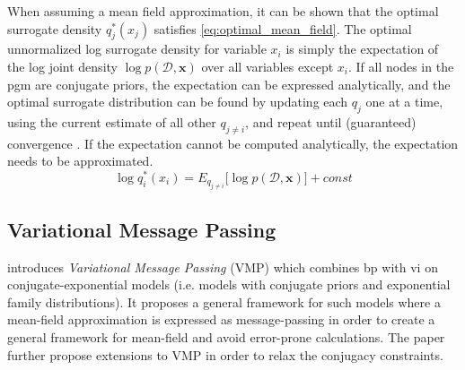 When assuming a mean field approximation, it can be shown that the optimal surrogate density $q_j^*(x_j)$ satisfies \cref{eq:optimal_mean_field}. The optimal unnormalized log surrogate density for variable $x_i$ is simply the expectation of the log joint density $\log p(\mathcal{D}, \boldsymbol{x})$ over all variables except $x_i$. If all nodes in the \acrshort{pgm} are conjugate priors, the expectation can be expressed analytically, and the optimal surrogate distribution can be found by updating each $q_j$ one at a time, using the current estimate of all other $q_{j\neq i}$, and repeat until (guaranteed) convergence \cite{bishop2007}. If the expectation cannot be computed analytically, the expectation needs to be approximated.
\begin{equation}\label{eq:optimal_mean_field}
    \log q_i^*(x_i) = E_{q_{j \neq i}}\big[\log p(\mathcal{D}, \mathbf{x}) \big] + const
\end{equation}

\subsection{Variational Message Passing}
\cite{winnbishop} introduces \textit{Variational Message Passing} (VMP) which combines \acrshort{bp} with \acrshort{vi} on conjugate-exponential models (i.e. models with conjugate priors and exponential family distributions). It proposes a general framework for such models where a mean-field approximation is expressed as message-passing in order to create a general framework for mean-field and avoid error-prone calculations. The paper further propose extensions to VMP in order to relax the conjugacy constraints.
